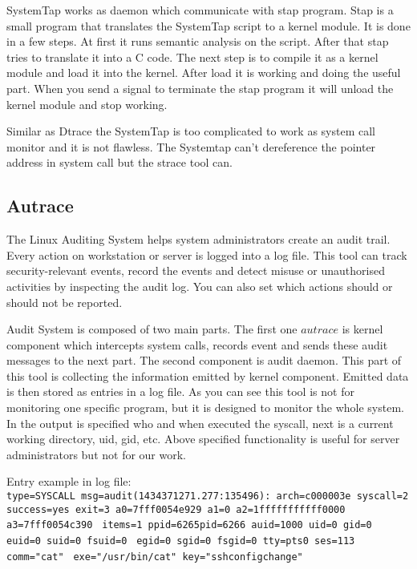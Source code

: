 SystemTap works as daemon which communicate with stap program.
Stap is a small program that translates the SystemTap script to a kernel module.
It is done in a few steps.
At first it runs semantic analysis on the script.
After that stap tries to translate it into a C code.
The next step is to compile it as a kernel module and load it into the kernel.
After load it is working and doing the useful part.
When you send a signal to terminate the stap program it will unload the kernel module and stop working.

Similar as Dtrace the SystemTap is too complicated to work as system call monitor and it is not flawless.
The Systemtap can't dereference the pointer address in system call but the strace tool can. 
 

\subsection{Autrace}
The Linux Auditing System helps system administrators create an audit trail.
Every action on workstation or server is logged into a log file.
This tool can track security-relevant events, record the events and detect misuse or unauthorised activities by inspecting the audit log.
You can also set which actions should or should not be reported.

Audit System is composed of two main parts.
The first one \(autrace\) is kernel component which intercepts system calls, records event and sends these audit messages to the next part.
The second component is audit daemon.
This part of this tool is collecting the information emitted by kernel component.
Emitted data is then stored as entries in a log file.
As you can see this tool is not for monitoring one specific program, but it is designed to monitor the whole system.
In the output is specified who and when executed the syscall, next is a current working directory, uid, gid, etc.
Above specified functionality is useful for server administrators but not for our work.

\pagebreak
Entry example in log file:\\
\noindent
\texttt{type=SYSCALL msg=audit(1434371271.277:135496): arch=c000003e syscall=2}\linebreak
\texttt{success=yes exit=3 a0=7fff0054e929 a1=0 a2=1fffffffffff0000 a3=7fff0054c390 }\linebreak
\texttt{items=1 ppid=6265pid=6266 auid=1000 uid=0 gid=0 euid=0 suid=0 fsuid=0 }\linebreak
\texttt{egid=0 sgid=0 fsgid=0 tty=pts0 ses=113 comm="cat" }\linebreak
\texttt{exe="/usr/bin/cat" key="sshconfigchange"}


